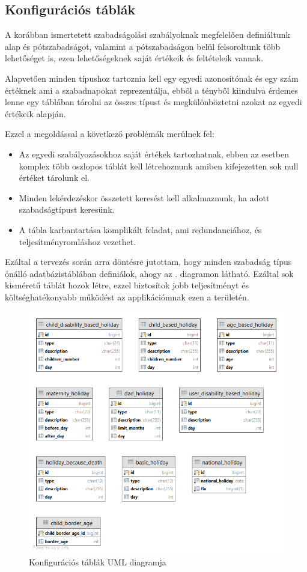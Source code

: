 \subsection{Konfigurációs táblák}

A korábban ismertetett szabadságolási szabályoknak megfelelően definiáltunk alap és pótszabadságot, valamint a pótszabadságon belül felsoroltunk több lehetőséget is, ezen lehetőségeknek saját értékeik és feltételeik vannak.

Alapvetően minden típushoz tartoznia kell egy egyedi azonosítónak és egy szám értéknek ami a szabadnapokat reprezentálja, ebből a tényből kiindulva érdemes lenne egy táblában tárolni az összes típust és megkülönböztetni azokat az egyedi értékeik alapján.

Ezzel a megoldással a következő problémák merülnek fel:
\begin{itemize}
	\item Az egyedi szabályozásokhoz saját értékek tartozhatnak, ebben az esetben komplex több oszlopos táblát kell létrehoznunk amiben kifejezetten sok null értéket tárolunk el.
	\item Minden lekérdezéskor összetett keresést kell alkalmaznunk, ha adott szabadságtípust keresünk.
	\item A tábla karbantartása komplikált feladat, ami redundanciához, és teljesítményromláshoz vezethet.
\end{itemize}

Ezáltal a tervezés során arra döntésre jutottam, hogy minden szabadság típus önálló adatbázistáblában definiálok, ahogy az . diagramon látható. Ezáltal sok kisméretű táblát hozok létre, ezzel biztosítok jobb teljesítményt és költséghatékonyabb működést az applikációmnak ezen a területén. 

\begin{figure}[h]
	\centering
	\includegraphics[scale=0.3]{images/configuration.png}
	\caption{Konfigurációs táblák UML diagramja}
	\label{fig:configurationUml}
\end{figure}

